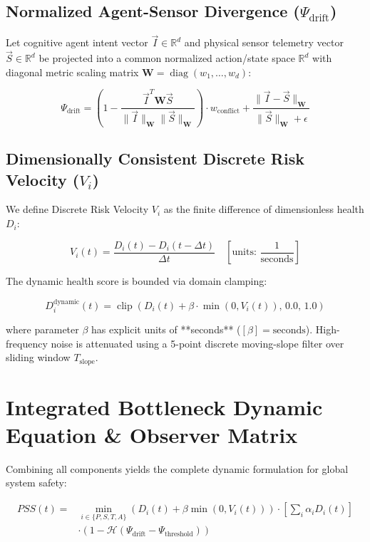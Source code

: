 \documentclass[conference]{IEEEtran}
\begin{document}
\subsection{Normalized Agent-Sensor Divergence ($\Psi_{\text{drift}}$)}
Let cognitive agent intent vector $\vec{I} \in \mathbb{R}^d$ and physical sensor telemetry vector $\vec{S} \in \mathbb{R}^d$ be projected into a common normalized action/state space $\mathbb{R}^d$ with diagonal metric scaling matrix $\mathbf{W} = \operatorname{diag}(w_1, \dots, w_d)$:

\begin{equation}
\Psi_{\text{drift}} = \left( 1 - \frac{\vec{I}^T \mathbf{W} \vec{S}}{\|\vec{I}\|_{\mathbf{W}} \|\vec{S}\|_{\mathbf{W}}} \right) \cdot w_{\text{conflict}} + \frac{\|\vec{I} - \vec{S}\|_{\mathbf{W}}}{\|\vec{S}\|_{\mathbf{W}} + \epsilon}
\end{equation}

\subsection{Dimensionally Consistent Discrete Risk Velocity ($V_i$)}
We define Discrete Risk Velocity $V_i$ as the finite difference of dimensionless health $D_i$:

\begin{equation}
V_i(t) = \frac{D_i(t) - D_i(t - \Delta t)}{\Delta t} \quad \left[\text{units: } \frac{1}{\text{seconds}}\right]
\end{equation}

The dynamic health score is bounded via domain clamping:

\begin{equation}
D_i^{\text{dynamic}}(t) = \operatorname{clip}\left( D_i(t) + \beta \cdot \min(0, V_i(t)), \, 0.0, \, 1.0 \right)
\end{equation}

where parameter $\beta$ has explicit units of **seconds** ($[\beta] = \text{seconds}$). High-frequency noise is attenuated using a 5-point discrete moving-slope filter over sliding window $T_{\text{slope}}$.

\section{Integrated Bottleneck Dynamic Equation \& Observer Matrix}

Combining all components yields the complete dynamic formulation for global system safety:

\begin{equation}
\begin{aligned}
PSS(t) = &\min_{i \in \{P,S,T,A\}} \left( D_i(t) + \beta \min(0, V_i(t)) \right) \cdot \left[ \sum_{i} \alpha_i D_i(t) \right] \\
&\cdot \left( 1 - \mathcal{H}(\Psi_{\text{drift}} - \Psi_{\text{threshold}}) \right)
\end{aligned}
\end{equation}
\end{document}
